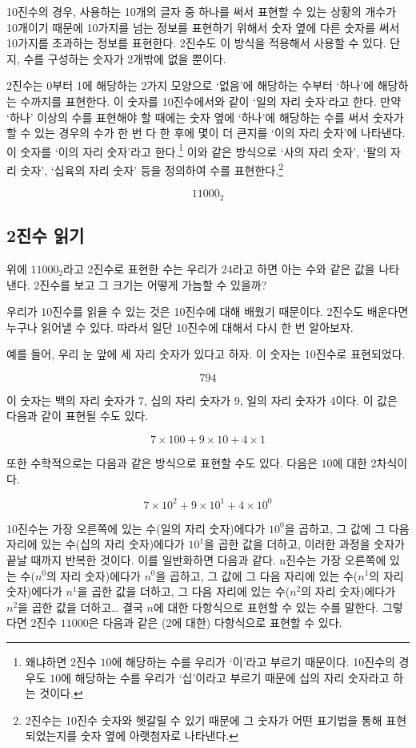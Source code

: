 \documentclass{article}
\begin{document}
10진수의 경우, 사용하는 10개의 글자 중 하나를 써서 표현할 수 있는 상황의 개수가
10개이기 때문에 10가지를 넘는 정보를 표현하기 위해서 숫자 옆에 다른 숫자를 써서
10가지를 초과하는 정보를 표현한다. 2진수도 이 방식을 적용해서 사용할 수 있다.
단지, 수를 구성하는 숫자가 2개밖에 없을 뿐이다.

2진수는 0부터 1에 해당하는 2가지 모양으로 `없음'에 해당하는 수부터 `하나'에
해당하는 수까지를 표현한다. 이 숫자를 10진수에서와 같이 `일의 자리 숫자'라고 한다.
만약 `하나' 이상의 수를 표현해야 할 때에는 숫자 옆에 `하나'에 해당하는 수를 써서
숫자가 할 수 있는 경우의 수가 한 번 다 한 후에 몇이 더 큰지를 `이의 자리 숫자'에
나타낸다. 이 숫자를 `이의 자리 숫자'라고 한다.\footnote{왜냐하면 2진수 $10$에
해당하는 수를 우리가 `이'라고 부르기 때문이다. 10진수의 경우도 $10$에 해당하는
수를 우리가 `십'이라고 부르기 때문에 십의 자리 숫자라고 하는 것이다.}
이와 같은 방식으로 `사의 자리 숫자', `팔의 자리 숫자', `십육의 자리 숫자' 등을
정의하여 수를 표현한다.\footnote{2진수는 10진수 숫자와 헷갈릴 수 있기 때문에 
그 숫자가 어떤 표기법을 통해 표현되었는지를 숫자 옆에 아랫첨자로 나타낸다.}

$$
11000_2
$$

\subsection{2진수 읽기}

위에 $11000_2$라고 2진수로 표현한 수는 우리가 $24$라고 하면 아는 수와 같은 값을
나타낸다. 2진수를 보고 그 크기는 어떻게 가늠할 수 있을까?

우리가 10진수를 읽을 수 있는 것은 10진수에 대해 배웠기 때문이다. 2진수도 배운다면
누구나 읽어낼 수 있다. 따라서 일단 10진수에 대해서 다시 한 번 알아보자.

예를 들어, 우리 눈 앞에 세 자리 숫자가 있다고 하자. 이 숫자는 10진수로 표현되었다.

$$
794
$$

이 숫자는 백의 자리 숫자가 7, 십의 자리 숫자가 9, 일의 자리 숫자가 4이다.
이 값은 다음과 같이 표현될 수도 있다.

$$
7 \times 100 + 9 \times 10 + 4 \times 1
$$

또한 수학적으로는 다음과 같은 방식으로 표현할 수도 있다. 다음은 $10$에 대한
2차식이다.

$$
7 \times 10^2 + 9 \times 10^1 + 4 \times 10^0
$$

10진수는 가장 오른쪽에 있는 수(일의 자리 숫자)에다가 $10^0$을 곱하고, 그 값에
그 다음 자리에 있는 수(십의 자리 숫자)에다가 $10^1$을 곱한 값을 더하고,
이러한 과정을 숫자가 끝날 때까지 반복한 것이다. 이를 일반화하면 다음과 같다.
n진수는 가장 오른쪽에 있는 수($n^0$의 자리 숫자)에다가 $n^0$을 곱하고, 그 값에
그 다음 자리에 있는 수($n^1$의 자리 숫자)에다가 $n^1$을 곱한 값을 더하고,
그 다음 자리에 있는 수($n^2$의 자리 숫자)에다가 $n^2$을 곱한 값을 더하고\dots
결국 $n$에 대한 다항식으로 표현할 수 있는 수를 말한다.
그렇다면 2진수 $11000$은 다음과 같은 (2에 대한) 다항식으로 표현할 수 있다.
\end{document}
